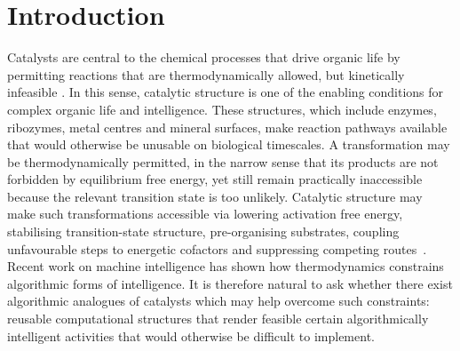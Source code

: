\documentclass[runningheads]{llncs}
\begin{document}
\section{Introduction}
\label{sec:intro}
Catalysts are central to the chemical processes that drive organic life by permitting reactions that are thermodynamically allowed, but kinetically infeasible \cite{laidler1987chemical}. In this sense, catalytic structure is one of the enabling conditions
for complex organic life and intelligence. These structures, which include enzymes, ribozymes, metal centres and mineral surfaces, make
reaction pathways available that would otherwise be unusable on
biological timescales. A transformation may be thermodynamically
permitted, in the narrow sense that its products are not forbidden by
equilibrium free energy, yet still remain practically inaccessible
because the relevant transition state is too unlikely. Catalytic
structure may make such transformations accessible via lowering activation free energy,
stabilising transition-state structure, pre-organising substrates,
coupling unfavourable steps to energetic cofactors and suppressing
competing routes~\cite{wolfenden2001depth,benkovic2003enzyme,garcia2010enzyme}. Recent work on machine intelligence \cite{ebtekar2025foundations,perrier2025watts,ebtekar2021information} has shown how thermodynamics constrains algorithmic forms of intelligence. It is therefore natural to ask whether there exist algorithmic analogues of
catalysts which may help overcome such constraints: reusable computational structures that render feasible certain algorithmically intelligent activities that would otherwise be difficult to implement. 
\end{document}
